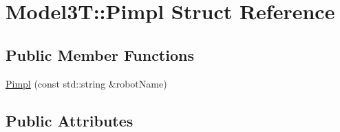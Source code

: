 \hypertarget{structModel3T_1_1Pimpl}{}\section{Model3T\+:\+:Pimpl Struct Reference}
\label{structModel3T_1_1Pimpl}
\subsection*{Public Member Functions}
\begin{DoxyCompactItemize}
\item 
\hyperlink{structModel3T_1_1Pimpl_a087fecc74d3a9f4867e971a6f4f379ef}{Pimpl} (const std\+::string \&robot\+Name)
\end{DoxyCompactItemize}
\subsection*{Public Attributes}
